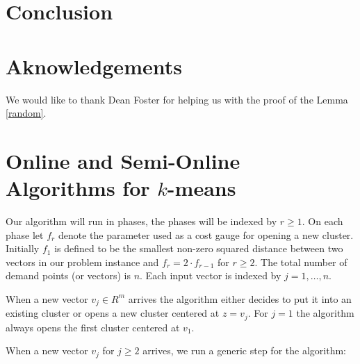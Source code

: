 \documentclass[11pt,twoside]{article}
\newcommand{\kmeans}{$k$-means}
\begin{document}
\section{Conclusion}
 
 
\section{Aknowledgements}
We would like to thank  Dean Foster for  helping us with the proof of the Lemma \ref{random}.








\appendix




\section{Online and Semi-Online Algorithms for \kmeans}\label{alg}

Our algorithm will run in phases, the phases will be indexed by $r\ge 1$. On each phase  let $f_r$ denote the parameter used as a cost gauge for opening a new cluster. Initially $f_1$ is defined to be the smallest non-zero squared distance between two vectors in our problem instance and $f_r=2\cdot f_{r-1}$ for $r\ge 2$.
The total number of demand points (or vectors) is $n$.  Each input vector is indexed by  $j=1,\dots,n$. 

When a new vector $v_j\in R^m$ arrives the algorithm either decides to put it into an existing cluster or opens a new cluster centered at $z=v_j$. For $j=1$ the algorithm always opens the first cluster centered at $v_1$.

When a new vector $v_j$ for $j\ge 2$ arrives, we run a generic step for the algorithm:
\end{document}
